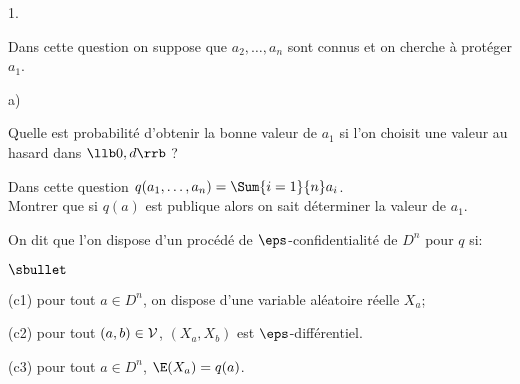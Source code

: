 \documentclass[11pt]{article}%
\begin{document}
\begin{noliste}{1.}
  \setlength{\itemsep}{4mm} %
  \setcounter{enumi}{11}
\item Dans cette question on suppose que $a_2,\ldots,a_n$ sont connus et
  on cherche à protéger $a_1$.
  \begin{noliste}{a)}
  \setlength{\itemsep}{2mm} %
  \item Quelle est probabilité d'obtenir la bonne valeur de $a_1$ si
    l'on choisit une valeur au hasard dans $\llb 0, d \rrb$ ?

    




  \item Dans cette question $q(a_1,\ldots,a_n) = \Sum{i=1}{n} a_i$.\\
    Montrer que si $q(a)$ est publique alors on sait déterminer la
    valeur de $a_1$.

    
  \end{noliste}
\end{noliste}
On dit que l'on dispose d'un procédé de $\eps$-confidentialité de
$D^n$ pour $q$ si:
\begin{liste}{$\sbullet$}
\item[(c1)] pour tout $a\in D^n$, on dispose d'une variable aléatoire
  réelle $X_a$;
\item[(c2)] pour tout $(a,b) \in {\cal V}$, $(X_a,X_b)$ est
  $\eps$-différentiel.
\item[(c3)] pour tout $a\in D^n$, $\E(X_a) = q(a)$.
\end{liste}~\\[-.4cm]
\end{document}
